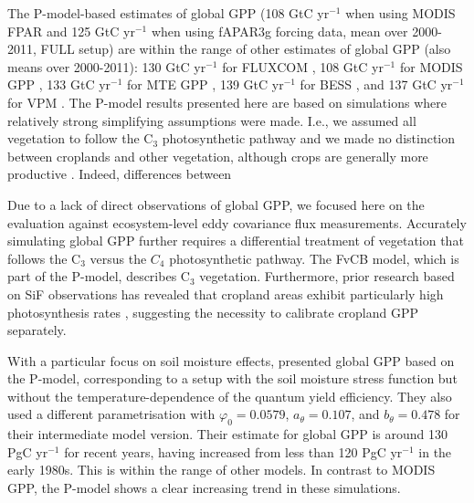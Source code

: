 \documentclass[gmd, manuscript]{copernicus}
\begin{document}
The P-model-based estimates of global GPP (108 GtC yr$^{-1}$ when using MODIS FPAR and 125 GtC yr$^{-1}$ when using fAPAR3g forcing data, mean over 2000-2011, FULL setup) are within the range of other estimates of global GPP (also means over 2000-2011): 130 GtC yr$^{-1}$ for FLUXCOM \citep{tramontana16bg}, 108 GtC yr$^{-1}$ for MODIS GPP \citep{modis_MOD17A2H}, 133 GtC yr$^{-1}$ for MTE GPP \citep{jung11jgr}, 139 GtC yr$^{-1}$ for BESS \citep{jiang16rse, ryu11gbc}, and 137 GtC yr$^{-1}$ for VPM \citep{zhang17scidat}. The P-model results presented here are based on simulations where relatively strong simplifying assumptions were made. I.e., we assumed all vegetation to follow the C$_3$ photosynthetic pathway and we made no distinction between croplands and other vegetation, although crops are generally more productive \citep{guanter14pnas}. Indeed, differences between 

Due to a lack of direct observations of global GPP, we focused here on the evaluation against ecosystem-level eddy covariance flux measurements. Accurately simulating global GPP further requires a differential treatment of vegetation that follows the C$_3$ versus the $C_4$ photosynthetic pathway. The FvCB model, which is part of the P-model, describes C$_3$ vegetation. Furthermore, prior research based on SiF observations has revealed that cropland areas exhibit particularly high photosynthesis rates \citep{guanter14pnas}, suggesting the necessity to calibrate cropland GPP separately.

With a particular focus on soil moisture effects, \citet{stocker19natgeo} presented global GPP based on the P-model, corresponding to a setup with the soil moisture stress function but without the temperature-dependence of the quantum yield efficiency. They also used a different parametrisation with $\varphi_0 = 0.0579$, $a_\theta = 0.107$, and $b_\theta = 0.478$ for their intermediate model version. Their estimate for global GPP is around 130 PgC yr$^{-1}$ for recent years, having increased from less than 120 PgC yr$^{-1}$ in the early 1980s. This is within the range of other models. In contrast to MODIS GPP, the P-model shows a clear increasing trend in these simulations.
\end{document}

